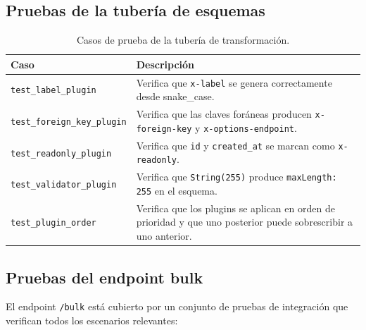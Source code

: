 \subsection{Pruebas de la tubería de esquemas}
\label{subsec:pruebas-pipeline}

\begin{table}[H]
  \centering
  \caption{Casos de prueba de la tubería de transformación.}
  \label{tab:tests-pipeline}
  \begin{tabular}{lp{9cm}}
    \toprule
    \textbf{Caso} & \textbf{Descripción} \\
    \midrule
    \texttt{test\_label\_plugin} & Verifica que \texttt{x-label} se genera
      correctamente desde snake\_case. \\
    \texttt{test\_foreign\_key\_plugin} & Verifica que las claves foráneas producen
      \texttt{x-foreign-key} y \texttt{x-options-endpoint}. \\
    \texttt{test\_readonly\_plugin} & Verifica que \texttt{id} y \texttt{created\_at}
      se marcan como \texttt{x-readonly}. \\
    \texttt{test\_validator\_plugin} & Verifica que \texttt{String(255)} produce
      \texttt{maxLength: 255} en el esquema. \\
    \texttt{test\_plugin\_order} & Verifica que los plugins se aplican en orden
      de prioridad y que uno posterior puede sobrescribir a uno anterior. \\
    \bottomrule
  \end{tabular}
\end{table}

\subsection{Pruebas del endpoint bulk}
\label{subsec:pruebas-bulk}

El endpoint \texttt{/bulk} está cubierto por un conjunto de pruebas de integración que
verifican todos los escenarios relevantes:

